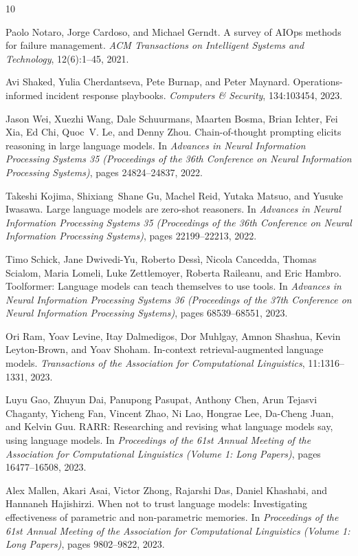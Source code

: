 \documentclass[conference]{IEEEtran}
\begin{document}
\balance
\begin{thebibliography}{10}

Paolo Notaro, Jorge Cardoso, and Michael Gerndt.
\newblock A survey of AIOps methods for failure management.
\newblock \emph{ACM Transactions on Intelligent Systems and Technology}, 12(6):1--45, 2021.

Avi Shaked, Yulia Cherdantseva, Pete Burnap, and Peter Maynard.
\newblock Operations-informed incident response playbooks.
\newblock \emph{Computers \& Security}, 134:103454, 2023.

Jason Wei, Xuezhi Wang, Dale Schuurmans, Maarten Bosma, Brian Ichter, Fei Xia, Ed Chi, Quoc~V. Le, and Denny Zhou.
\newblock Chain-of-thought prompting elicits reasoning in large language models.
\newblock In \emph{Advances in Neural Information Processing Systems 35 (Proceedings of the 36th Conference on Neural Information Processing Systems)}, pages 24824--24837, 2022.

Takeshi Kojima, Shixiang~Shane Gu, Machel Reid, Yutaka Matsuo, and Yusuke Iwasawa.
\newblock Large language models are zero-shot reasoners.
\newblock In \emph{Advances in Neural Information Processing Systems 35 (Proceedings of the 36th Conference on Neural Information Processing Systems)}, pages 22199--22213, 2022.

Timo Schick, Jane Dwivedi-Yu, Roberto Dess{\`i}, Nicola Cancedda, Thomas Scialom, Maria Lomeli, Luke Zettlemoyer, Roberta Raileanu, and Eric Hambro.
\newblock Toolformer: Language models can teach themselves to use tools.
\newblock In \emph{Advances in Neural Information Processing Systems 36 (Proceedings of the 37th Conference on Neural Information Processing Systems)}, pages 68539--68551, 2023.

Ori Ram, Yoav Levine, Itay Dalmedigos, Dor Muhlgay, Amnon Shashua, Kevin Leyton-Brown, and Yoav Shoham.
\newblock In-context retrieval-augmented language models.
\newblock \emph{Transactions of the Association for Computational Linguistics}, 11:1316--1331, 2023.

Luyu Gao, Zhuyun Dai, Panupong Pasupat, Anthony Chen, Arun Tejasvi Chaganty, Yicheng Fan, Vincent Zhao, Ni Lao, Hongrae Lee, Da-Cheng Juan, and Kelvin Guu.
\newblock RARR: Researching and revising what language models say, using language models.
\newblock In \emph{Proceedings of the 61st Annual Meeting of the Association for Computational Linguistics (Volume 1: Long Papers)}, pages 16477--16508, 2023.

Alex Mallen, Akari Asai, Victor Zhong, Rajarshi Das, Daniel Khashabi, and Hannaneh Hajishirzi.
\newblock When not to trust language models: Investigating effectiveness of parametric and non-parametric memories.
\newblock In \emph{Proceedings of the 61st Annual Meeting of the Association for Computational Linguistics (Volume 1: Long Papers)}, pages 9802--9822, 2023.

\end{thebibliography}
\end{document}
